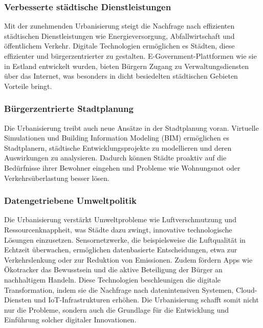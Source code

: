 \documentclass[conference,compsoc,final,a4paper, onecolumn, 11pt]{IEEEtran}
\begin{document}
\subsubsection{ Verbesserte städtische Dienstleistungen}
Mit der zunehmenden Urbanisierung steigt die Nachfrage nach effizienten städtischen Dienstleistungen wie Energieversorgung, Abfallwirtschaft und öffentlichem Verkehr. 
Digitale Technologien ermöglichen es Städten, diese effizienter und bürgerzentrierter zu gestalten. 
E-Government-Plattformen wie sie in Estland entwickelt wurden, bieten Bürgern Zugang zu Verwaltungsdiensten über das Internet, was besonders in dicht besiedelten städtischen Gebieten Vorteile bringt.\autocite{un_habitat_world_cities}


\subsubsection{ Bürgerzentrierte Stadtplanung}
Die Urbanisierung treibt auch neue Ansätze in der Stadtplanung voran. 
Virtuelle Simulationen und Building Information Modeling (BIM) ermöglichen es Stadtplanern, städtische Entwicklungsprojekte zu modellieren und deren Auswirkungen zu analysieren. 
Dadurch können Städte proaktiv auf die Bedürfnisse ihrer Bewohner eingehen und Probleme wie Wohnungsnot oder Verkehrsüberlastung besser lösen.\autocite{mckinsey_smart_cities}


\subsubsection{ Datengetriebene Umweltpolitik}
Die Urbanisierung verstärkt Umweltprobleme wie Luftverschmutzung und Ressourcenknappheit, was Städte dazu zwingt, innovative technologische Lösungen einzusetzen. 
Sensornetzwerke, die beispielsweise die Luftqualität in Echtzeit überwachen, ermöglichen datenbasierte Entscheidungen, etwa zur Verkehrslenkung oder zur Reduktion von Emissionen. 
Zudem fördern Apps wie Ökotracker das Bewusstsein und die aktive Beteiligung der Bürger an nachhaltigem Handeln. 
Diese Technologien beschleunigen die digitale Transformation, indem sie die Nachfrage nach datenintensiven Systemen, Cloud-Diensten und \ac{IoT}-Infrastrukturen erhöhen. 
Die Urbanisierung schafft somit nicht nur die Probleme, sondern auch die Grundlage für die Entwicklung und Einführung solcher digitaler Innovationen.\autocite{mdpi_smart_cities_iot}

 
\end{document}
